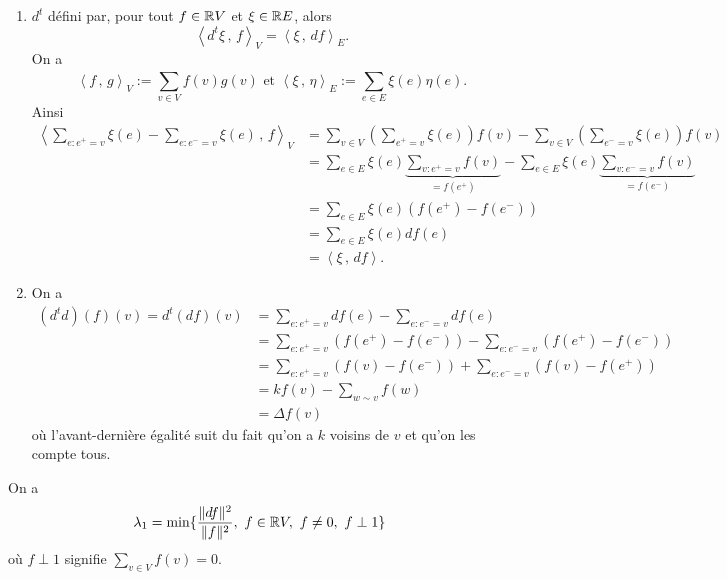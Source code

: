 \begin{preuve}
  \begin{enumerate}
  \item $d^t$ défini par, pour tout $f \in \mathbb{R} V$ et $\xi \in \mathbb{R} E$, alors 
    \[ \left \langle d^t \xi\, ,\, f \right \rangle_V = \left \langle \xi\, ,\, d f \right \rangle_E. \]
    On a 
    \[ \left \langle f\, ,\, g \right \rangle_V := \sum_{v \in V}^{}f(v)g(v) \text{ et } \left \langle \xi\,
        ,\, \eta \right \rangle_E := \sum_{e \in E}^{} \xi(e)\eta(e). \]
    Ainsi 
    \begin{align*}
      \left \langle \sum_{e:e^+ = v}^{} \xi(e) - \sum_{e:e^- = v}^{} \xi(e)\, ,\, f \right
      \rangle_V
      &= \sum_{v \in V}^{} \left( \sum_{e^+=v}^{} \xi(e) \right)f(v) - \sum_{v \in V}^{} \left(\sum_{e^- =
        v}^{} \xi(e)\right)f(v)\\
      &= \sum_{e \in E}^{} \xi(e) \underbrace{\sum_{v: e^+ = v}^{} f(v)}_{=f(e^+)} - \sum_{e \in E}^{} \xi(e)
        \underbrace{\sum_{v: e^- = v}^{}f(v)}_{=f(e^-)}\\
      &= \sum_{e \in E}^{} \xi(e)\left( f(e^+) - f(e^-) \right)\\
      &= \sum_{e \in E}^{} \xi(e) df(e)\\
      &= \left \langle \xi\, ,\, df \right \rangle.
    \end{align*}

    
  \item On a 
    \begin{align*}
      (d^td)(f)(v) = d^t(df)(v)
      &= \sum_{e: e^+ = v}^{} df(e) - \sum_{e: e^- = v}^{} df(e)\\
      &= \sum_{e: e^+ = v}^{}(f(e^+) - f(e^-)) - \sum_{e: e^- = v}^{}(f(e^+) - f(e^-))\\
      &= \sum_{e: e^+ = v}^{}(f(v) - f(e^-)) + \sum_{e: e^- = v}^{}(f(v) - f(e^+))\\
      &= k f(v) - \sum_{w \sim v}^{} f(w)\\
      &= \Delta f(v)
    \end{align*}
    où l'avant-dernière égalité suit du fait qu'on a $k$ voisins de $v$ et qu'on les compte tous.
  \end{enumerate}
\end{preuve}

\begin{exercice}
  On a 
  \[ \lambda_1 = \min\{\frac{\|df\|^2}{\|f\|^2},\ f \in \mathbb{R} V,\ f \neq 0,\ f \perp 1\} \]
    où $f \perp 1$ signifie $\sum_{v \in V}^{} f(v) = 0$.
\end{exercice}


